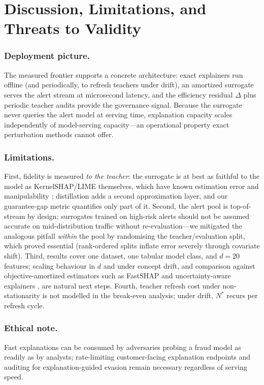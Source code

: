 \documentclass[runningheads]{llncs}
\begin{document}
\section{Discussion, Limitations, and Threats to Validity}
\label{sec:discussion}

\subsubsection{Deployment picture.}
The measured frontier supports a concrete architecture: exact explainers
run offline (and periodically, to refresh teachers under drift), an
amortized surrogate serves the alert stream at microsecond latency, and
the efficiency residual $\Delta$ plus periodic teacher audits provide the
governance signal. Because the surrogate never queries the alert model at
serving time, explanation capacity scales independently of model-serving
capacity---an operational property exact perturbation methods cannot
offer.

\subsubsection{Limitations.}
First, fidelity is measured \emph{to the teacher}: the surrogate is at
best as faithful to the model as KernelSHAP/LIME themselves, which have
known estimation error and manipulability \cite{slack2020,alvarez2018};
distillation adds a second approximation layer, and our guarantee-gap
metric quantifies only part of it. Second, the alert pool is
top-of-stream by design; surrogates trained on high-risk alerts should not
be assumed accurate on mid-distribution traffic without re-evaluation---we
mitigated the analogous pitfall \emph{within} the pool by randomising the
teacher/evaluation split, which proved essential (rank-ordered splits
inflate error severely through covariate shift). Third, results cover one
dataset, one tabular model class, and $d{=}20$ features; scaling behaviour
in $d$ and under concept drift, and comparison against
objective-amortized estimators such as FastSHAP \cite{jethani2022} and
uncertainty-aware explainers \cite{schwab2019}, are natural next steps.
Fourth, teacher refresh cost under non-stationarity is not modelled in the
break-even analysis; under drift, $N^\ast$ recurs per refresh cycle.

\subsubsection{Ethical note.}
Fast explanations can be consumed by adversaries probing a fraud model as
readily as by analysts; rate-limiting customer-facing explanation
endpoints and auditing for explanation-guided evasion remain necessary
regardless of serving speed.
\end{document}
